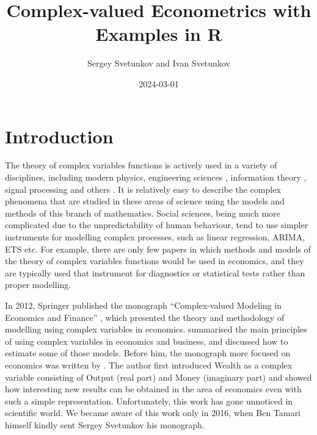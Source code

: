 \documentclass[
]{book}
\title{Complex-valued Econometrics with Examples in R}
\author{Sergey Svetunkov and Ivan Svetunkov}
\date{2024-03-01}
\begin{document}
\maketitle

{
\setcounter{tocdepth}{2}
\tableofcontents
}
\hypertarget{introduction}{%
\chapter*{Introduction}\label{introduction}}

The theory of complex variables functions is actively used in a variety of disciplines, including modern physics, engineering sciences \citep{Mandic2007, Jia2016}, information theory \citep{Eriksson2006}, signal processing \citep{Arens1957, Brown1969, Gardner1993, Charge2001, Gerstacker2003, Delmas2004, Chevalier2006, Buzzi2006, Percival2006, Taubock2007, Rubin-Delanchy2007, Adali2008} and others \citep[e.g.][]{Kociuba2016}. It is relatively easy to describe the complex phenomena that are studied in these areas of science using the models and methods of this branch of mathematics. Social sciences, being much more complicated due to the unpredictability of human behaviour, tend to use simpler instruments for modelling complex processes, such as linear regression, ARIMA, ETS etc. For example, there are only few papers in which methods and models of the theory of complex variables functions would be used in economics, and they are typically used that instrument for diagnostics or statistical tests \citep[for example, for the unit root test, such as ADF from][]{Dickey1979} rather than proper modelling.

In 2012, Springer published the monograph ``Complex-valued Modeling in Economics and Finance'' \citep{Svetunkov2012}, which presented the theory and methodology of modelling using complex variables in economics. \citet{Svetunkov2012} summarised the main principles of using complex variables in economics and business, and discussed how to estimate some of those models. Before him, the monograph more focused on economics was written by \citet{Tamari1997}. The author first introduced Wealth as a complex variable consisting of Output (real part) and Money (imaginary part) and showed how interesting new results can be obtained in the area of economics even with such a simple representation. Unfortunately, this work has gone unnoticed in scientific world. We became aware of this work only in 2016, when Ben Tamari himself kindly sent Sergey Svetunkov his monograph.
\end{document}
